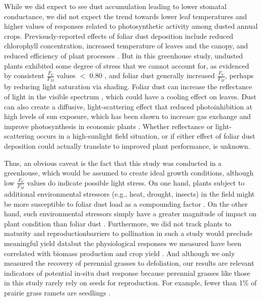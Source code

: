 \documentclass{svjour3}
\begin{document}
While we did expect to see dust accumulation leading to lower stomatal conductance, we did not expect the trend towards lower leaf temperatures and higher values of responses related to photosynthetic activity among dusted annual crops. 
Previously-reported effects of foliar dust deposition include reduced chlorophyll concentration, increased temperature of leaves and the canopy, and reduced efficiency of plant processes \citep{eller1977, ulrichs2008,zia-khan2014, sarma2017}. 
But in this greenhouse study, undusted plants exhibited some degree of stress that we cannot account for, as evidenced by consistent $\frac{F_{V}}{F_{M}}$ values $<$ 0.80 \citep[e.g.,][Fig.~S1]{rizza2001}, and foliar dust generally increased $\frac{F_{V}}{F_{M}}$, perhaps by reducing light saturation via shading.
Foliar dust can increase the reflectance of light in the visible spectrum \citep{wu2016}, which could have a cooling effect on leaves. 
Dust can also create a diffusive, light-scattering effect that reduced photoinhibition at high levels of sun exposure, which has been shown to increase gas exchange and improve photosynthesis in economic plants \citep{jifon2003, kromdijk2016}. 
Whether reflectance or light-scattering occurs in a high-sunlight field situation, or if either effect of foliar dust deposition could actually translate to improved plant performance, is unknown. 

Thus, an obvious caveat is the fact that this study was conducted in a greenhouse, which would be assumed to create ideal growth conditions, although low $\frac{F_{V}}{F_{M}}$ values do indicate possible light stress. 
On one hand, plants subject to additional environmental stressors (e.g., heat, drought, insects) in the field might be more susceptible to foliar dust load as a compounding factor \citep[e.g.,][]{zheng2020}. 
On the other hand, such environmental stressors simply have a greater magnitude of impact on plant condition than foliar dust \citep{matsuki2016}. 
Furthermore, we did not track plants to maturity and reproduction\textemdash barriers to pollination in such a study would preclude meaningful yield data\textemdash but the physiological responses we measured have been correlated with biomass production and crop yield \citep[e.g.,][]{fischer1998, zia-khan2014}. 
And although we only measured the recovery of perennial grasses to defoliation, our results are relevant indicators of potential in-situ dust response because perennial grasses like those in this study rarely rely on seeds for reproduction. 
For example, fewer than 1\% of prairie grass ramets are seedlings \citep{benson2006}. 
 
\end{document}
